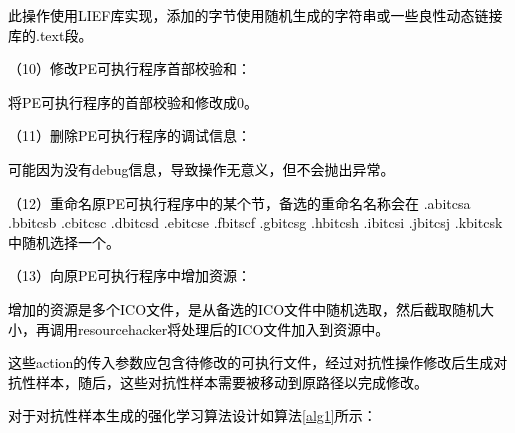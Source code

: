 \textcolor{black}{此操作使用LIEF库实现，添加的字节使用随机生成的字符串或一些良性动态链接库的.text段。}

\textcolor{black}{（10）修改PE可执行程序首部校验和：}

\textcolor{black}{将PE可执行程序的首部校验和修改成0。}

\textcolor{black}{（11）删除PE可执行程序的调试信息：}

\textcolor{black}{可能因为没有debug信息，导致操作无意义，但不会抛出异常。}

\textcolor{black}{（12）重命名原PE可执行程序中的某个节，备选的重命名名称会在
.abitcsa .bbitcsb .cbitcsc .dbitcsd .ebitcse .fbitscf .gbitcsg .hbitcsh .ibitcsi .jbitcsj .kbitcsk中随机选择一个。
}

\textcolor{black}{（13）向原PE可执行程序中增加资源：}

\textcolor{black}{增加的资源是多个ICO文件，是从备选的ICO文件中随机选取，然后截取随机大小，再调用resourcehacker将处理后的ICO文件加入到资源中。}

\textcolor{black}{这些action的传入参数应包含待修改的可执行文件，经过对抗性操作修改后生成对抗性样本，随后，这些对抗性样本需要被移动到原路径以完成修改。}

\textcolor{black}{对于对抗性样本生成的强化学习算法设计如算法\ref{alg1}所示：}

